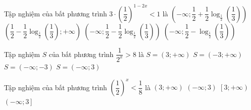 \begin{ex}%
	Tập nghiệm của bất phương trình $3 \cdot  \left(\dfrac{1}{2}\right)^{1-2x}<1$ là
	 \choice
		{  $\left(-\infty;\dfrac{1}{2}+\dfrac{1}{2}\log_{\tfrac{1}{2}}\left(\dfrac{1}{3}\right)\right)$}
		{$\left(\dfrac{1}{2}-\dfrac{1}{2}\log_{\tfrac{1}{2}}\left(\dfrac{1}{3}\right);+\infty\right)$} 
		{\True  $\left(-\infty;\dfrac{1}{2}-\dfrac{1}{2}\log_{\tfrac{1}{2}}\left(\dfrac{1}{3}\right)\right)$}
		 {$\left(-\infty;\dfrac{1}{2}-\log_{\tfrac{1}{2}}\left(\dfrac{1}{3}\right)\right)$}
\end{ex}

\begin{ex}%
	 Tập nghiệm $S$ của bất phương trình $\dfrac{1}{2^x}>8$ là
	\choice 
		{ $S=\left(3;+\infty\right)$} 
		 {$S=\left(-3;+\infty\right)$}
		{\True  $S=\left(-\infty;-3\right)$}
		 {$S=\left(-\infty;3\right)$}
\end{ex}

\begin{ex}%
	Tập  nghiệm của bất phương trình $\left(\dfrac{1}{2}\right)^x<\dfrac{1}{8}$ là
	 \choice
		 {\True $\left(3;+\infty\right)$}
		 {$\left(-\infty;3\right)$}
		{$\left[3;+\infty\right)$} 
		{$\left(-\infty;3\right]$} 
\end{ex}

